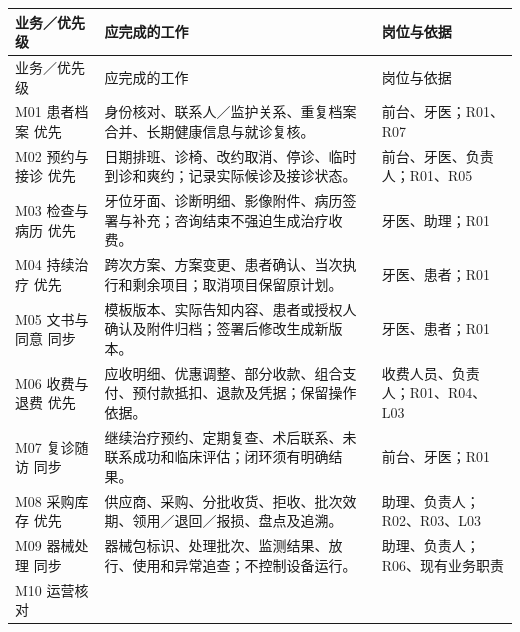 \documentclass[UTF8,a4paper,zihao=-4,fontset=none]{ctexart}
\begin{document}
{\small
\begin{longtable}{@{}p{2.6cm}p{8.1cm}p{4.8cm}@{}}
\toprule
业务／优先级 & 应完成的工作 & 岗位与依据 \\ \midrule
\endfirsthead
\toprule
业务／优先级 & 应完成的工作 & 岗位与依据 \\ \midrule
\endhead
\raggedright\arraybackslash M01 患者档案
优先 & \raggedright\arraybackslash 身份核对、联系人／监护关系、重复档案合并、长期健康信息与就诊复核。 & \raggedright\arraybackslash 前台、牙医；R01、R07 \\[4pt]
\raggedright\arraybackslash M02 预约与接诊
优先 & \raggedright\arraybackslash 日期排班、诊椅、改约取消、停诊、临时到诊和爽约；记录实际候诊及接诊状态。 & \raggedright\arraybackslash 前台、牙医、负责人；R01、R05 \\[4pt]
\raggedright\arraybackslash M03 检查与病历
优先 & \raggedright\arraybackslash 牙位牙面、诊断明细、影像附件、病历签署与补充；咨询结束不强迫生成治疗收费。 & \raggedright\arraybackslash 牙医、助理；R01 \\[4pt]
\raggedright\arraybackslash M04 持续治疗
优先 & \raggedright\arraybackslash 跨次方案、方案变更、患者确认、当次执行和剩余项目；取消项目保留原计划。 & \raggedright\arraybackslash 牙医、患者；R01 \\[4pt]
\raggedright\arraybackslash M05 文书与同意
同步 & \raggedright\arraybackslash 模板版本、实际告知内容、患者或授权人确认及附件归档；签署后修改生成新版本。 & \raggedright\arraybackslash 牙医、患者；R01 \\[4pt]
\raggedright\arraybackslash M06 收费与退费
优先 & \raggedright\arraybackslash 应收明细、优惠调整、部分收款、组合支付、预付款抵扣、退款及凭据；保留操作依据。 & \raggedright\arraybackslash 收费人员、负责人；R01、R04、L03 \\[4pt]
\raggedright\arraybackslash M07 复诊随访
同步 & \raggedright\arraybackslash 继续治疗预约、定期复查、术后联系、未联系成功和临床评估；闭环须有明确结果。 & \raggedright\arraybackslash 前台、牙医；R01 \\[4pt]
\raggedright\arraybackslash M08 采购库存
优先 & \raggedright\arraybackslash 供应商、采购、分批收货、拒收、批次效期、领用／退回／报损、盘点及追溯。 & \raggedright\arraybackslash 助理、负责人；R02、R03、L03 \\[4pt]
\raggedright\arraybackslash M09 器械处理
同步 & \raggedright\arraybackslash 器械包标识、处理批次、监测结果、放行、使用和异常追查；不控制设备运行。 & \raggedright\arraybackslash 助理、负责人；R06、现有业务职责 \\[4pt]
\raggedright\arraybackslash M10 运营核对

\end{longtable}}
\end{document}
